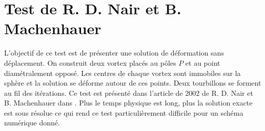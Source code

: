 




\section{Test de R. D. Nair et B. Machenhauer}

L'objectif de ce test est de présenter une solution de déformation sans déplacement. On construit deux vortex placés au pôles $P$ et au point diamétralement opposé. Les centres de chaque vortex sont immobiles sur la sphère et la solution se déforme autour de ces points. Deux tourbillons se forment au fil des itérations. Ce test est présenté dans l'article de 2002 de R. D. Nair et B. Machenhauer dans \cite{Nair2002}. 
Plus le temps physique est long, plus la solution exacte est sous résolue ce qui rend ce test particulièrement difficile pour un schéma numérique donné.

